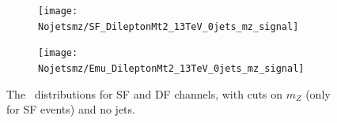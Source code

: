\begin{figure}[h!]
\captionsetup{width=0.8\textwidth}	   
	\begin{subfigure}[t]{0.5\textwidth}
		\label{fig:SF_0jets_mz_mt2}
        \texttt{[image: Nojetsmz/SF\_DileptonMt2\_13TeV\_0jets\_mz\_signal]} 
        \end{subfigure} 
     \begin{subfigure}[t]{0.5\textwidth}
		\label{fig:DF_0jets_mz_mt2}
        \texttt{[image: Nojetsmz/Emu\_DileptonMt2\_13TeV\_0jets\_mz\_signal]} 
        \end{subfigure}      
\caption{The \mttwo \, distributions for SF and DF channels, with cuts on $m_Z$ (only for SF events) and no jets.}	
        \label{fig:0jets_mz}
\end{figure}

